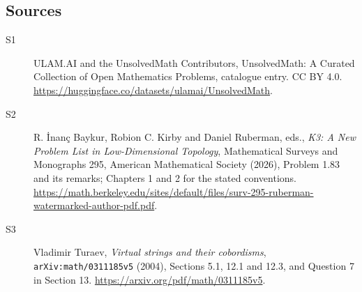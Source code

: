 \documentclass[11pt]{article}
\begin{document}
\subsection{Sources}
\begin{description}
\item[\hypertarget{source:statement:1}{S1}] ULAM.AI and the UnsolvedMath Contributors, UnsolvedMath: A Curated Collection of Open Mathematics Problems, catalogue entry. CC BY 4.0. \url{https://huggingface.co/datasets/ulamai/UnsolvedMath}.
\item[\hypertarget{source:statement:2}{S2}] R. İnanç Baykur, Robion C. Kirby and Daniel Ruberman, eds., \emph{K3: A New Problem List in Low-Dimensional Topology}, Mathematical Surveys and Monographs 295, American Mathematical Society (2026), Problem 1.83 and its remarks; Chapters 1 and 2 for the stated conventions. \url{https://math.berkeley.edu/sites/default/files/surv-295-ruberman-watermarked-author-pdf.pdf}.
\item[\hypertarget{source:statement:3}{S3}] Vladimir Turaev, \emph{Virtual strings and their cobordisms}, \nolinkurl{arXiv:math/0311185v5} (2004), Sections 5.1, 12.1 and 12.3, and Question 7 in Section 13. \url{https://arxiv.org/pdf/math/0311185v5}.
\end{description}
\label{end:statement}
\end{document}
